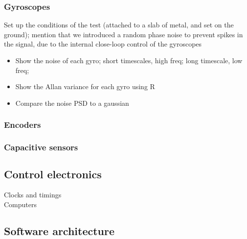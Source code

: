 \subsubsection{Gyroscopes}
Set up the conditions of the test (attached to a slab of metal, and set on the ground); mention that we introduced a random phase noise to prevent spikes in the signal, due to the internal close-loop control of the gyroscopes
\begin{itemize}
\item Show the noise of each gyro; short timescales, high freq; long timescale, low freq;
\item Show the Allan variance for each gyro using R
\item Compare the noise PSD to a gaussian
\end{itemize}
\subsubsection{Encoders}
\subsubsection{Capacitive sensors}
\subsubsection{}
\subsection{Control electronics}
Clocks and timings \\
Computers
\subsection{Software architecture}

